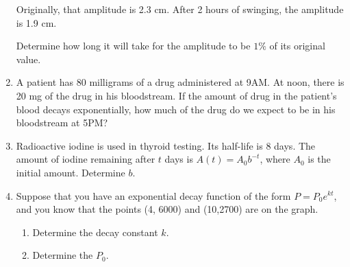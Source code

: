 \begin{enumerate}
Originally, that amplitude is 2.3 cm. After 2 hours of swinging, the amplitude is 1.9 cm.

Determine how long it will take for the amplitude to be $1\%$ of its original value.
\vfill
\item A patient has 80 milligrams of a drug administered at 9AM.  At noon, there is 20 mg of the drug in his bloodstream.  If the amount of drug in the patient's blood decays exponentially, how much of the drug do we expect to be in his bloodstream at 5PM?\vfill

%

\clearpage

\item Radioactive iodine is used in thyroid testing.  Its half-life is 8 days.  The amount of iodine remaining after $t$ days is $A(t)=A_0b^{-t}$, where $A_0$ is the initial amount.  Determine $b$.\vfill

\item Suppose that you have an exponential decay function of the form $P=P_0e^{kt}$, and you know that the points (4, 6000) and (10,2700) are on the graph.
\begin{enumerate}
\item Determine the decay constant $k$.
\vfill
\vfill
\item Determine the $P_0$.
\vfill
\end{enumerate}



\end{enumerate}


